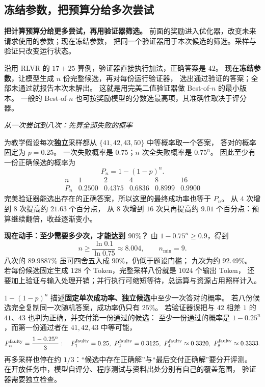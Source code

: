 

\subsection{冻结参数，把预算分给多次尝试}
\label{concept:test-time-compute}

\textbf{把计算预算分给更多尝试，再用验证器筛选。}
前面的奖励进入优化器，改变未来请求使用的参数；现在冻结参数，
把同一个验证器用于本次候选的筛选。采样与验证只改变运行状态。

沿用 RLVR 的 $17+25$ 算例，验证器直接执行加法，正确答案是 $42$。
现在\textbf{冻结参数}，让模型生成 $n$ 份完整候选，再对每份运行验证器，
选出通过验证的答案；全部未通过就报告本次未解出。
这就是用完美二值验证器做 Best-of-$n$ 的最小版本。
一般的 Best-of-$n$ 也可按奖励模型的分数选最高项，其准确性取决于评分器。

\begin{example}[breakable=false]
\noindent\emph{从一次尝试到八次：先算全部失败的概率}\par
为教学假设每次\textbf{独立}采样都从 $\{41,42,43,50\}$ 中等概率取一个答案，
答对的概率固定为 $p=0.25$。
一次失败概率是 $0.75$；$n$ 次全失败概率是 $0.75^n$。
因此至少有一份正确候选的概率为
\[
P_n=1-(1-p)^n.
\]
\[
\begin{array}{c|ccccc}
n&1&2&4&8&16\\\hline
P_n&0.2500&0.4375&0.6836&0.8999&0.9900
\end{array}
\]
完美验证器能选出存在的正确答案，所以这里的最终成功率也等于 $P_n$。
从 $4$ 次增到 $8$ 次提高约 $21.63$ 个百分点，
从 $8$ 次增到 $16$ 次只再提高约 $9.01$ 个百分点：预算继续翻倍，收益逐渐变小。
\end{example}



\textbf{现在动手：至少需要多少次，才能达到 $90\%$？}
由 $1-0.75^n\geq0.9$，得到
\[
n\geq\frac{\ln0.1}{\ln0.75}\approx8.004,
\qquad n_{\min}=9.
\]
八次的 $89.9887\%$ 虽可四舍五入成 $90\%$，仍低于题设门槛；
九次为约 $92.49\%$。
若每份候选固定生成 $128$ 个 Token，完整采样八份就是 $1024$ 个输出 Token，
还要加上验证与输入处理开销；并行执行可缩短等待，总运算与资源占用照样计入。

\begin{boundarybox}
$1-(1-p)^n$ 描述\textbf{固定单次成功率、独立候选}中至少一次答对的概率。
若八份候选完全复制同一次随机答案，成功率仍只有 $25\%$。
若验证器误把与 $42$ 相差 $1$ 的 $41$、$43$ 也判为正确，并交付第一份通过的候选：
至少一份通过的概率是 $1-0.25^n$，而第一份通过者在 $41,42,43$ 中等可能，
\[
P^{\rm faulty}_n=\frac{1-0.25^n}{3}:\quad
P^{\rm faulty}_1=0.25,\ P^{\rm faulty}_2=0.3125,\ P^{\rm faulty}_4\approx0.3320,\ P^{\rm faulty}_8\approx0.3333.
\]
再多采样也停在约 $1/3$：“候选中存在正确解”与“最后交付正确解”要分开评测。
在开放任务中，模型自评分、程序测试与资料出处分别有自己的覆盖范围，
验证器需要独立检查。
\end{boundarybox}

